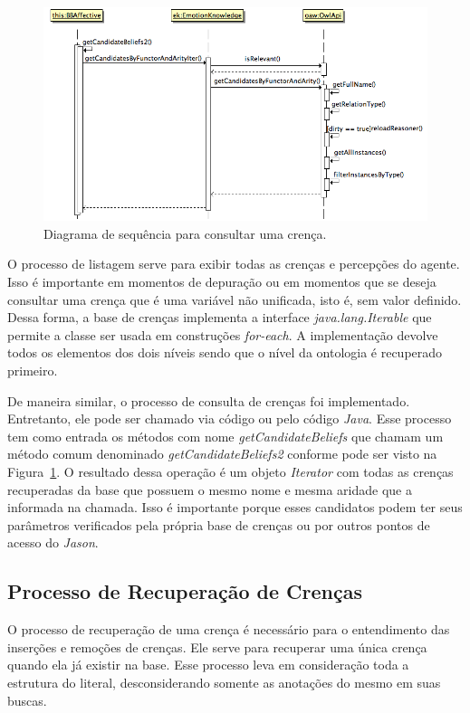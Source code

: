 \begin{figure}
  \centering
  \includegraphics[width=12cm]{figuras/sd-getCB.png}
  \caption{Diagrama de sequência para consultar uma crença.}
  \label{fig:getCandidates}
\end{figure}

O processo de listagem serve para exibir todas as crenças e percepções do
agente. Isso é importante em momentos de depuração ou em momentos que se
deseja consultar uma crença que é uma variável não unificada, isto é, sem
valor definido. Dessa forma, a base de crenças implementa a interface
\emph{java.lang.Iterable} que permite a classe ser usada em construções
\emph{for-each}. A implementação devolve todos os elementos dos dois níveis
sendo que o nível da ontologia é recuperado primeiro.

De maneira similar, o processo de consulta de crenças foi implementado.
Entretanto, ele pode ser chamado via código \jason ou pelo código \emph{Java}.
Esse processo tem como entrada os métodos com nome \emph{getCandidateBeliefs}
que chamam um método comum denominado \emph{getCandidateBeliefs2} conforme
pode ser visto na Figura~\ref{fig:getCandidates}. O resultado dessa operação é
um objeto \emph{Iterator} com todas as crenças recuperadas da base que possuem
o mesmo nome e mesma aridade que a informada na chamada. Isso é importante
porque esses candidatos podem ter seus parâmetros verificados pela própria
base de crenças ou por outros pontos de acesso do \emph{Jason}.

\subsection{Processo de Recuperação de Crenças}

O processo de recuperação de uma crença é necessário para o entendimento das
inserções e remoções de crenças. Ele serve para recuperar uma única crença
quando ela já existir na base. Esse processo leva em consideração toda a
estrutura do literal, desconsiderando somente as anotações do mesmo em suas
buscas.

